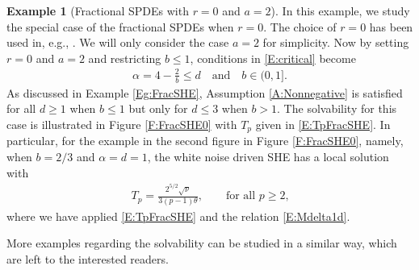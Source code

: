 \documentclass[12pt]{report}
\theoremstyle{plain}
\theoremstyle{definition}
\newtheorem{example}[theorem]{Example}
\numberwithin{equation}{section}
\begin{document}
\begin{example}[Fractional SPDEs with $r=0$ and $a=2$] \label{Eg:FracSHE0}
	In this example, we study the special case of the fractional SPDEs when $r=0$. The choice of $r=0$
	has been used in, e.g., \cite{chen.hu.ea:17:space-time}.  We will only consider the case $a=2$ for simplicity. Now
	by setting $r=0$ and $a=2$ and restricting $b\le 1$, conditions in \eqref{E:critical} become
	\begin{align} \label{E:CrFrSHE2}
	\alpha =4- \frac{2}{b} \le d \quad  \text{and} \quad b\in (0,1].
	\end{align}
	As discussed in Example \ref{Eg:FracSHE}, Assumption \ref{A:Nonnegative} is satisfied for all
	$d\ge 1$ when $b\le 1$ but only for $d\le 3$ when $b>1$. The solvability for this case is
	illustrated in Figure \ref{F:FracSHE0} with $T_p$ given in \eqref{E:TpFracSHE}. In particular, for
	the example in the second figure in Figure \ref{F:FracSHE0}, namely, when $b=2/3$ and
	$\alpha=d=1$, the white noise driven SHE has a local solution with
	\begin{align}
	T_p= \frac{2^{5/2}\sqrt{\nu}}{3(p-1)\theta}, \qquad \text{for all $p\ge 2$,}
	\end{align}
	where we have applied \eqref{E:TpFracSHE} and the relation \eqref{E:Mdelta1d}.
\end{example}

More examples regarding the solvability can be studied in a similar way, which are left to the
interested readers.
\end{document}
